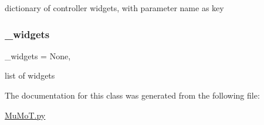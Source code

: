 dictionary of controller widgets, with parameter name as key 

\mbox{\label{class_mu_mo_t_1_1_mu_mo_tcontroller_a397d0ee37a222317a1bab7deb1270a13}} 
\subsubsection{\texorpdfstring{\+\_\+widgets}{\_widgets}}
{\footnotesize\ttfamily \+\_\+widgets = None\hspace{0.3cm}{\ttfamily [static]}, {\ttfamily [private]}}



list of widgets 



The documentation for this class was generated from the following file\+:\begin{DoxyCompactItemize}
\item 
\hyperlink{_mu_mo_t_8py}{Mu\+Mo\+T.\+py}\end{DoxyCompactItemize}

